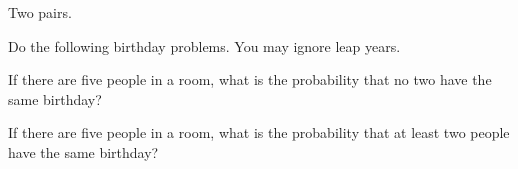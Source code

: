\begin{puzzle}
    Two pairs.
\end{puzzle}

Do the following birthday problems. You may ignore leap years.

\begin{puzzle}
    If there are five people in a room, what is the probability that no two have the same birthday?

\end{puzzle}

\begin{puzzle}
    If there are five people in a room, what is the probability that at least two people have the same
    birthday?
\end{puzzle}